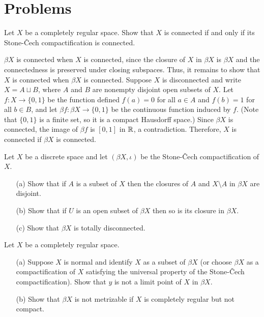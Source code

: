 \section{Problems}

\begin{prob}
    Let $X$ be a completely regular space.
    Show that $X$ is connected if and only if its Stone-\v{C}ech compactification is connected.
\end{prob}
\begin{sol}
    $\beta X$ is connected when $X$ is connected, since the closure of $X$ in $\beta X$ is $\beta X$ and the connectedness is preserved under closing subspaces.
    Thus, it remains to show that $X$ is connected when $\beta X$ is connected.
    Suppose $X$ is disconnected and write $X=A\sqcup B$, where $A$ and $B$ are nonempty disjoint open subsets of $X$.
    Let $f: X\rightarrow \{0, 1\}$ be the function defined $f(a)=0$ for all $a\in A$ and $f(b)=1$ for all $b\in B$, and let $\beta f: \beta X\rightarrow \{0, 1\}$ be the continuous function induced by $f$. (Note that $\{0, 1\}$ is a finite set, so it is a compact Hausdorff space.)
    Since $\beta X$ is connected, the image of $\beta f$ is $[0, 1]$ in ${\mathbb{R}}$, a contradiction.
    Therefore, $X$ is connected if $\beta X$ is connected.
\end{sol}

\begin{prob}
    Let $X$ be a discrete space and let $(\beta X, \iota)$ be the Stone-\v{C}ech compactification of $X$.
    \begin{enumerate}
        \item[(a)]
        {
            Show that if $A$ is a subset of $X$ then the closures of $A$ and $X\setminus A$ in $\beta X$ are disjoint.
        }
        \item[(b)]
        {
            Show that if $U$ is an open subset of $\beta X$ then so is its closure in $\beta X$.
        }
        \item[(c)]
        {
            Show that $\beta X$ is totally disconnected.
        }
    \end{enumerate}
\end{prob}
\begin{sol}
    
\end{sol}

\begin{prob}
    Let $X$ be a completely regular space.
    \begin{enumerate}
        \item[(a)]
        {
            Suppose $X$ is normal and identify $X$ as a subset of $\beta X$ (or choose $\beta X$ as a compactification of $X$ satisfying the universal property of the Stone-\v{C}ech compactification).
            Show that $y$ is not a limit point of $X$ in $\beta X$.
        }
        \item[(b)]
        {
            Show that $\beta X$ is not metrizable if $X$ is completely regular but not compact.
        }
    \end{enumerate}
\end{prob}
\begin{sol}
    
\end{sol}